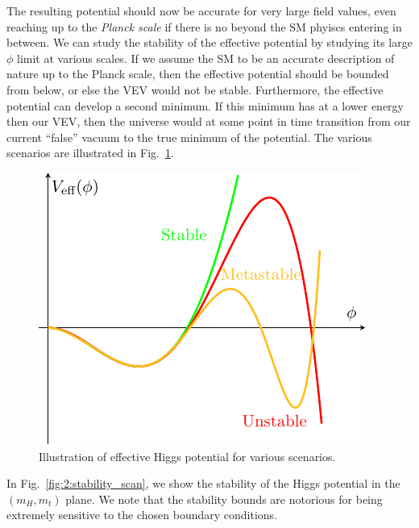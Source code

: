 The resulting potential should now be accurate for very large field values, even reaching up to the \textit{Planck scale} if there is no beyond the \acs{SM} phyiscs entering in between. We can study the stability of the effective potential by studying its large $\phi$ limit at various scales. If we assume the \acs{SM} to be an accurate description of nature up to the Planck scale, then the effective potential should be bounded from below, or else the \acs{VEV} would not be stable. Furthermore, the effective potential can develop a second minimum. If this minimum has at a lower energy then our \acs{VEV}, then the universe would at some point in time transition from our current ``false'' vacuum to the true minimum of the potential. The various scenarios are illustrated in Fig.~\ref{fig:2:Veff_illustration}.
\begin{figure}[h]
\centering
\includegraphics[scale=1.1]{Images/Veff_illustration.pdf}
\caption{Illustration of effective Higgs potential for various scenarios.}
\label{fig:2:Veff_illustration}
\end{figure}
In Fig.~\ref{fig:2:stability_scan}, we show the stability of the Higgs potential in the $(m_H, m_t)$ plane. We note that the stability bounds are notorious for being extremely sensitive to the chosen boundary conditions.
